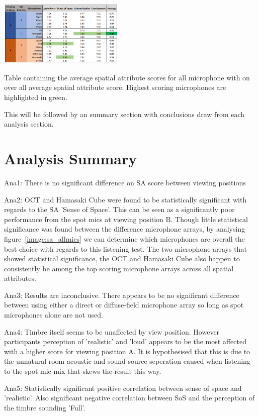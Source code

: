 	\begin{table}
	\begin{center}
		\includegraphics[width=0.45\textwidth]{images/graphs/results_sum_graph_V3.PNG}
		\caption{Table containing the average spatial attribute scores for all microphone with on over all average spatial attribute score. Highest scoring microphones are highlighted in green.}
		\label{image:results_sum} 
	\end{center}
	\end{table}	

	This will be followed by an summary section with conclusions draw from each analysis section.

	
	
	
	
	
	

	\section{Analysis Summary}



		Ana1: There is no significant difference on SA score between viewing positions

		Ana2: OCT and Hamasaki Cube were found to be statistically significant with regards to the SA 'Sense of Space'. This can be seen as a significantly poor performance from the spot mics at viewing position B. Though little statistical significance was found between the difference microphone arrays, by analysing figure~\ref{image:sa_allmics} we can determine which microphones are overall the best choice with regards to this listening test. The two microphone arrays that showed statistical significance, the OCT and Hamasaki Cube also happen to consistently be among the top scoring microphone arrays across all spatial attributes.

		Ana3: Results are inconclusive. There appears to be no significant difference between using either a direct or diffuse-field microphone array so long as spot microphones alone are not used.

		Ana4: Timbre itself seems to be unaffected by view position. However participants perception of 'realistic' and 'loud' appears to be the most affected with a higher score for viewing position A. It is hypothesised that this is due to the unnatural room acoustic and sound source seperation caused when listening to the spot mic mix that skews the result this way.

		Ana5: Statistically significant positive correlation between sense of space and 'realistic'. Also significant negative correlation between SoS and the perception of the timbre sounding 'Full'.

